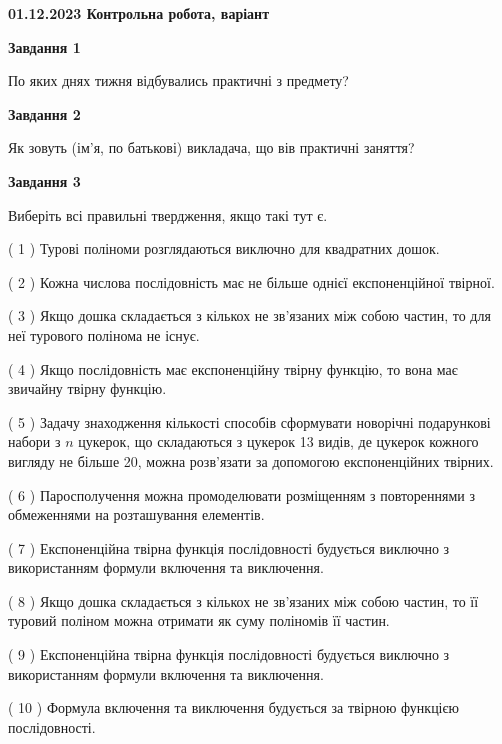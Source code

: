\documentclass[12pt, ukrainian]{article}
\begin{document}
\begin {large}

\textbf{01.12.2023 Контрольна робота, варіант  }\par


{
{\begin {center}\textbf{Завдання 1}\end {center}}\par
По яких днях тижня відбувались практичні з предмету?\par
{\begin {center}\textbf{Завдання 2}\end {center}}\par
Як зовуть (ім'я, по батькові) викладача, що вів практичні заняття?\par
{\begin {center}\textbf{Завдання 3}\end {center}}\par
Виберіть всі правильні твердження, якщо такі тут є.\par
\vspace{2mm}
( 1 ) Турові поліноми розглядаються виключно для квадратних дошок.%

( 2 ) Кожна числова послідовність має не більше однієї  експоненційної твірної.%

( 3 ) Якщо дошка складається з кількох не зв’язаних між собою частин, то для неї турового полінома не існує.%

( 4 ) Якщо послідовність має експоненційну твірну функцію, то вона має звичайну твірну функцію.%

( 5 ) Задачу знаходження кількості способів сформувати новорічні подарункові набори з $n$ цукерок, що складаються з цукерок 13 видів, де цукерок кожного вигляду не більше 20, можна розв’язати за допомогою експоненційних твірних.%

( 6 ) Паросполучення можна промоделювати розміщенням з повтореннями з обмеженнями на розташування елементів.%

( 7 ) Експоненційна твірна функція послідовності будується виключно з використанням формули включення та виключення.%

( 8 ) Якщо дошка складається з кількох не зв’язаних між собою частин, то її туровий поліном можна отримати як суму поліномів її частин.%

( 9 ) Експоненційна твірна функція послідовності будується виключно з використанням формули включення та виключення.%

( 10 ) Формула включення та виключення будується за твірною функцією послідовності.%
}
\end {large}

\vspace{4mm}
\newpage
\end{document}
